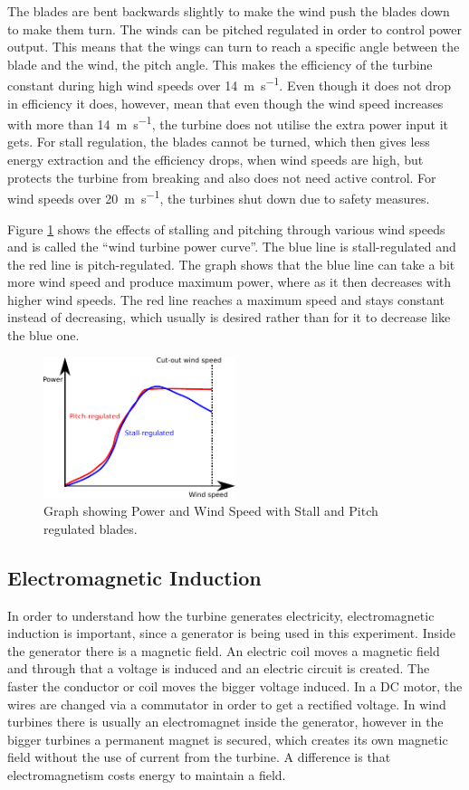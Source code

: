\documentclass[12pt]{article}
\begin{document}
The blades are bent backwards slightly to make the wind push the blades down to make them turn.
The winds can be pitched regulated in order to control power output.
This means that the wings can turn to reach a specific angle between the blade and the wind, the pitch angle.
This makes the efficiency of the turbine constant during high wind speeds over \SI{14}{\metre\per\second}.
Even though it does not drop in efficiency it does, however, mean that even though the wind speed increases with more than \SI{14}{\metre\per\second}, the turbine does not utilise the extra power input it gets.
For stall regulation, the blades cannot be turned, which then gives less energy extraction and the efficiency drops, when wind speeds are high, but protects the turbine from breaking and also does not need active control.
For wind speeds over \SI{20}{\metre\per\second}, the turbines shut down due to safety measures.

Figure \ref{figure:OfficialTurbine} shows the effects of stalling and pitching through various wind speeds and is called the ``wind turbine power curve''.
The blue line is stall-regulated and the red line is pitch-regulated.
The graph shows that the blue line can take a bit more wind speed and produce maximum power, where as it then decreases with higher wind speeds.
The red line reaches a maximum speed and stays constant instead of decreasing, which usually is desired rather than for it to decrease like the blue one.

\begin{figure}
  \centering
  \includegraphics[width=0.5\textwidth]{img/WindTurbine.pdf}
  \caption{Graph showing Power and Wind Speed with Stall and Pitch regulated blades.}
  \label{figure:OfficialTurbine}
\end{figure}

\subsection{Electromagnetic Induction}
In order to understand how the turbine generates electricity, electromagnetic induction is important, since a generator is being used in this experiment.
Inside the generator there is a magnetic field.
An electric coil moves a magnetic field and through that a voltage is induced and an electric circuit is created.
The faster the conductor or coil moves the bigger voltage induced.
In a DC motor, the wires are changed via a commutator in order to get a rectified voltage.
In wind turbines there is usually an electromagnet inside the generator, however in the bigger turbines a permanent magnet is secured, which creates its own magnetic field without the use of current from the turbine.
A difference is that electromagnetism costs energy to maintain a field.
\end{document}
